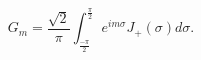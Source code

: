 \begin{equation}
G_{m}=\frac{\sqrt{2}}{\pi}\int_{\frac{-\pi}{2}}^{\frac{\pi}{2}}e^{im\sigma}J_{+}(\sigma)d\sigma.
\end{equation}

